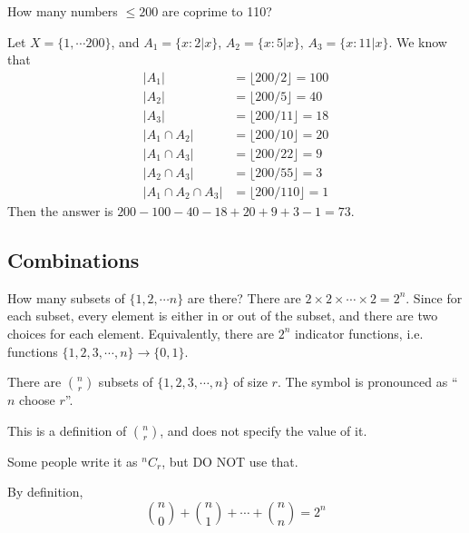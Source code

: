 \documentclass[a4paper]{article}
\begin{document}
  \begin{eg}
    How many numbers $\leq 200$ are coprime to 110?

    Let $X = \{ 1, \cdots 200\}$, and $A_1 = \{x: 2 | x\}$, $A_2 = \{x: 5|x\}$, $A_3 = \{x: 11|x\}$. We know that
    \begin{align*}
      |A_1| &= \lfloor 200/2\rfloor = 100\\
      |A_2| &= \lfloor 200/5\rfloor = 40\\
      |A_3| &= \lfloor 200/11\rfloor = 18\\
      |A_1\cap A_2| &= \lfloor 200/10\rfloor = 20\\
      |A_1\cap A_3| &= \lfloor 200/22\rfloor = 9\\
      |A_2\cap A_3| &= \lfloor 200/55\rfloor = 3\\
      |A_1 \cap A_2\cap A_3| &= \lfloor 200/110\rfloor = 1
    \end{align*}
    Then the answer is $200 - 100 - 40 - 18 + 20 + 9 + 3 - 1 = 73$.
  \end{eg}

  \subsection{Combinations}
  \begin{eg}
    How many subsets of $\{1, 2, \cdots n\}$ are there? There are $2\times 2\times \cdots \times 2 = 2^n$. Since for each subset, every element is either in or out of the subset, and there are two choices for each element. Equivalently, there are $2^n$ indicator functions, i.e. functions $\{1, 2, 3, \cdots, n\} \to \{0, 1\}$.
  \end{eg}

  \begin{defi}
    There are ${n \choose r}$ subsets of $\{1, 2, 3, \cdots, n\}$ of size $r$. The symbol is pronounced as ``$n$ choose $r$''.

    \note This is a definition of ${n \choose r}$, and does not specify the value of it.
  \end{defi}

  \begin{notation}
    Some people write it as $^nC_r$, but DO NOT use that.
  \end{notation}

  \begin{prop}
    By definition, 
    \[
      {n \choose 0} + {n \choose 1} + \cdots + {n\choose n} = 2^n
    \]
  \end{prop}
\end{document}
